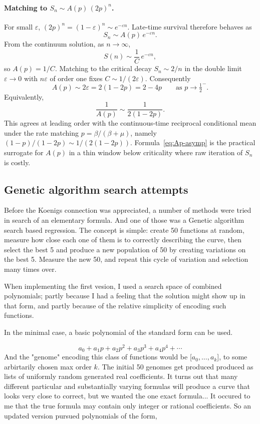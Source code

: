 \documentclass[11pt,a4paper]{article}
\theoremstyle{plain}
\theoremstyle{definition}
\begin{document}
\paragraph{Matching to $S_n\sim A(p)\,(2p)^n$.}
For small $\varepsilon$, $(2p)^n=(1-\varepsilon)^n\sim e^{-\varepsilon n}$. Late-time survival therefore behaves as
\[
S_n\sim A(p)\,e^{-\varepsilon n}.
\]
From the continuum solution, as $n\to\infty$,
\[
S(n)\sim \frac{1}{C}\,e^{-\varepsilon n},
\]
so $A(p)=1/C$. Matching to the critical decay $S_n\sim 2/n$ in the double limit $\varepsilon\to0$ with $n\varepsilon$ of order one fixes $C\sim 1/(2\varepsilon)$. Consequently
\begin{equation}
\label{eq:Ap-asymp}
A(p)
\sim
2\varepsilon
=
2(1-2p)
=
2-4p
\qquad\text{as }p\to\tfrac12^-.
\end{equation}
Equivalently,
\[
\frac{1}{A(p)}
\sim
\frac{1}{2(1-2p)}.
\]
This agrees at leading order with the continuous-time reciprocal conditional mean under the rate matching $p=\beta/(\beta+\mu)$, namely $(1-p)/(1-2p)\sim 1/(2(1-2p))$. Formula~\eqref{eq:Ap-asymp} is the practical surrogate for $A(p)$ in a thin window below criticality where raw iteration of $S_n$ is costly.

\subsection{Genetic algorithm search attempts}

Before the Koenigs connection was appreciated, a number of methods were tried in search of an elementary formula. 
And one of those was a Genetic algorithm search based regression. The concept is simple: create
50 functions at random, measure how close each one of them is to correctly describing the curve,
then select the best 5 and produce a new population of 50 by creating variations on the best 5. 
Measure the new 50, and repeat this cycle of variation and selection many times over.

When implementing the first vesion, I used a search space of combined polynomials; partly because I 
had a feeling that the solution might show up in that form, and partly because of the relative simplicity
of encoding such functions. 

In the minimal case, a basic polynomial of the standard form can be used. 

$$a_0 + a_1p + a_2 p^2 + a_3 p^3 + a_4 p^4 + \cdots$$
And the "genome" encoding this class of functions would be [$a_0,\dots,a_k$], to some arbirtarily chosen max order $k$.
The initial 50 genomes get produced produced as lists of uniformly random generated real coefficients.
It turns out that many different particular and substantially varying formulas will produce a curve that looks very close to correct, but we wanted the one exact formula...
It occured to me that the true formula may contain only integer or rational coefficients. So an updated version pursued polynomials of the form,
\end{document}
